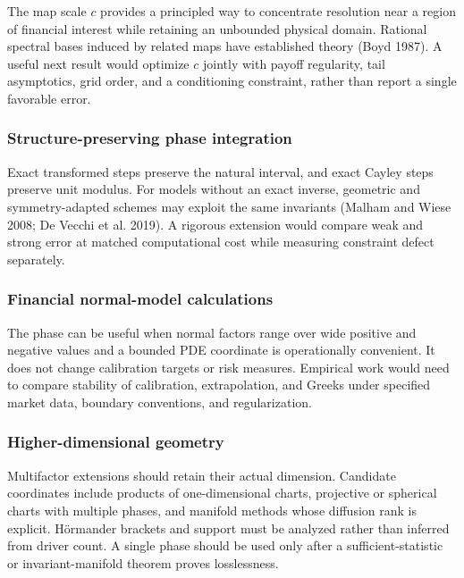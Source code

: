 \documentclass[
  english,
  10pt,
  letterpaper,
  DIV=11,
  numbers=noendperiod]{scrartcl}
\theoremstyle{definition}
\theoremstyle{plain}
\theoremstyle{plain}
\theoremstyle{remark}
\begin{document}
The map scale \(c\) provides a principled way to concentrate resolution
near a region of financial interest while retaining an unbounded
physical domain. Rational spectral bases induced by related maps have
established theory (Boyd 1987). A useful next result would optimize
\(c\) jointly with payoff regularity, tail asymptotics, grid order, and
a conditioning constraint, rather than report a single favorable error.

\subsubsection{Structure-preserving phase
integration}\label{structure-preserving-phase-integration}

Exact transformed steps preserve the natural interval, and exact Cayley
steps preserve unit modulus. For models without an exact inverse,
geometric and symmetry-adapted schemes may exploit the same invariants
(Malham and Wiese 2008; De Vecchi et al. 2019). A rigorous extension
would compare weak and strong error at matched computational cost while
measuring constraint defect separately.

\subsubsection{Financial normal-model
calculations}\label{financial-normal-model-calculations}

The phase can be useful when normal factors range over wide positive and
negative values and a bounded PDE coordinate is operationally
convenient. It does not change calibration targets or risk measures.
Empirical work would need to compare stability of calibration,
extrapolation, and Greeks under specified market data, boundary
conventions, and regularization.

\subsubsection{Higher-dimensional
geometry}\label{higher-dimensional-geometry}

Multifactor extensions should retain their actual dimension. Candidate
coordinates include products of one-dimensional charts, projective or
spherical charts with multiple phases, and manifold methods whose
diffusion rank is explicit. Hörmander brackets and support must be
analyzed rather than inferred from driver count. A single phase should
be used only after a sufficient-statistic or invariant-manifold theorem
proves losslessness.
\end{document}
